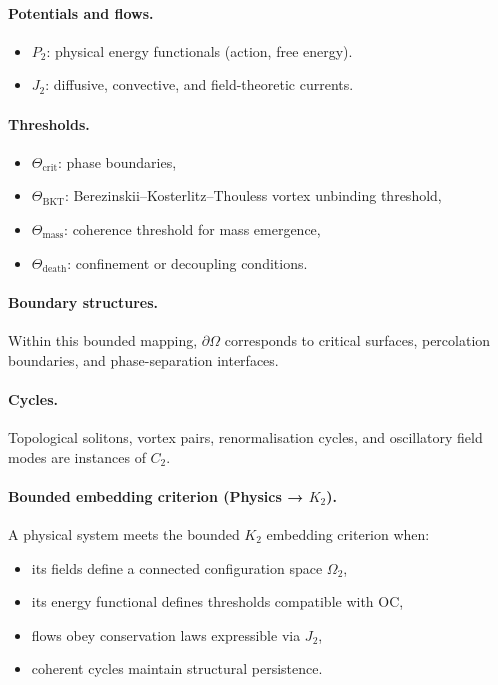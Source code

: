 \paragraph{Potentials and flows.}
\begin{itemize}
  \item \(P_2\): physical energy functionals (action, free energy).
  \item \(J_2\): diffusive, convective, and field-theoretic currents.
\end{itemize}

\paragraph{Thresholds.}
\begin{itemize}
  \item \(\Theta_{\mathrm{crit}}\): phase boundaries,
  \item \(\Theta_{\mathrm{BKT}}\): Berezinskii--Kosterlitz--Thouless vortex
        unbinding threshold,
  \item \(\Theta_{\mathrm{mass}}\): coherence threshold for mass emergence,
  \item \(\Theta_{\mathrm{death}}\): confinement or decoupling conditions.
\end{itemize}

\paragraph{Boundary structures.}
Within this bounded mapping, \(\partial\Omega\) corresponds to critical
surfaces, percolation boundaries, and phase-separation interfaces.

\paragraph{Cycles.}
Topological solitons, vortex pairs, renormalisation cycles, and oscillatory
field modes are instances of \(C_2\).

\paragraph{Bounded embedding criterion (Physics → \texorpdfstring{\(K_2\)}{K2}).}
A physical system meets the bounded \(K_2\) embedding criterion when:
\begin{itemize}
  \item its fields define a connected configuration space \(\Omega_2\),
  \item its energy functional defines thresholds compatible with OC,
  \item flows obey conservation laws expressible via \(J_2\),
  \item coherent cycles maintain structural persistence.
\end{itemize}

